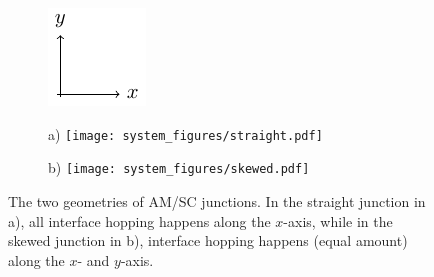 \documentclass[aps,twocolumn,amsmath,amssymb,preprintnumbers,floatfix,prl,superscriptaddress,longbibliography]{revtex4-2}%
\begin{document}
\begin{figure}[htb]
    \begin{subfigure}[c]{0.15\linewidth}
    \vspace{5em}
        \includegraphics[width = \linewidth]{plots_maintext/coord.pdf}
    \end{subfigure}
    \hspace{1em}
    \begin{subfigure}[t]{0.35 \linewidth}
        \Large a)
    \texttt{[image: system\_figures/straight.pdf]}
    \end{subfigure}
    \hspace{2em}
    \begin{subfigure}[t]{0.3 \linewidth}
        \Large b)
    \texttt{[image: system\_figures/skewed.pdf]}
    \end{subfigure}
    \caption{The two geometries of AM/SC junctions. In the straight junction in a), all interface hopping happens along the $x$-axis, while in the skewed junction in b), interface hopping happens (equal amount) along the $x$- and $y$-axis. }
    \label{fig:geometries}
\end{figure}
\end{document}
